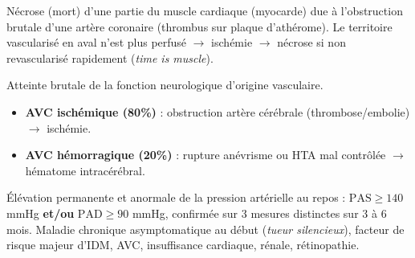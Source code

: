 \documentclass[11pt]{article}
\begin{document}
\begin{definition}
Nécrose (mort) d'une partie du muscle cardiaque (myocarde) due à l'obstruction brutale d'une artère coronaire (thrombus sur plaque d'athérome). Le territoire vascularisé en aval n'est plus perfusé $\rightarrow$ ischémie $\rightarrow$ nécrose si non revascularisé rapidement (\emph{time is muscle}).
\end{definition}

\begin{definition}
Atteinte brutale de la fonction neurologique d'origine vasculaire.
\begin{itemize}
    \item \textbf{AVC ischémique (80\%)} : obstruction artère cérébrale (thrombose/embolie) $\rightarrow$ ischémie.
    \item \textbf{AVC hémorragique (20\%)} : rupture anévrisme ou HTA mal contrôlée $\rightarrow$ hématome intracérébral.
\end{itemize}
\end{definition}

\begin{definition}
Élévation permanente et anormale de la pression artérielle au repos : $\text{PAS} \ge 140$ mmHg \textbf{et/ou} $\text{PAD} \ge 90$ mmHg, confirmée sur 3 mesures distinctes sur 3 à 6 mois. Maladie chronique asymptomatique au début (\emph{tueur silencieux}), facteur de risque majeur d'IDM, AVC, insuffisance cardiaque, rénale, rétinopathie.
\end{definition}
\end{document}
